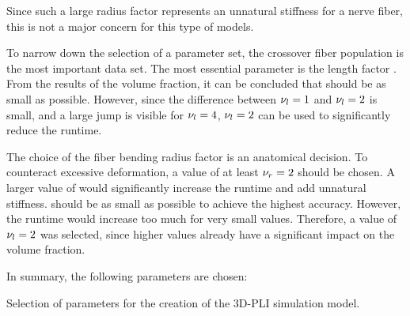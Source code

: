 Since such a large radius factor represents an unnatural stiffness for a nerve fiber, this is not a major concern for this type of models.
\par
%
To narrow down the selection of a parameter set, the crossover fiber population \cfbs{} is the most important data set.
The most essential parameter is the length factor \segLengthFactor{}.
From the results of the volume fraction, it can be concluded that \segLengthFactor{} should be as small as possible.
However, since the difference between $\textnormal{$\nu_{l}$}=\SI{1}{}$ and $\textnormal{$\nu_{l}$}=\SI{2}{}$ is small, and a large jump is visible for $\textnormal{$\nu_{l}$}=\SI{4}{}$, $\textnormal{$\nu_{l}$}=\SI{2}{}$ can be used to significantly reduce the runtime.
\par
%
The choice of the fiber bending radius factor \segRadiusFactor{} is an anatomical decision.
To counteract excessive deformation, a value of at least $\textnormal{$\nu_{r}$} = \SI{2}{}$ should be chosen.
A larger value of \segRadiusFactor{} would significantly increase the runtime and add unnatural stiffness.
\segLengthFactor{} should be as small as possible to achieve the highest accuracy.
However, the runtime would increase too much for very small values.
Therefore, a value of $\textnormal{$\nu_{l}$} = \SI{2}{}$ was selected, since higher values already have a significant impact on the volume fraction.
\par
%
In summary, the following parameters are chosen:
%
\begin{table}[H]
%
\centering
\caption{Selection of parameters for the creation of the \ac{3D-PLI} simulation model.}
\label{tab:parameterSetup}
\end{table}
